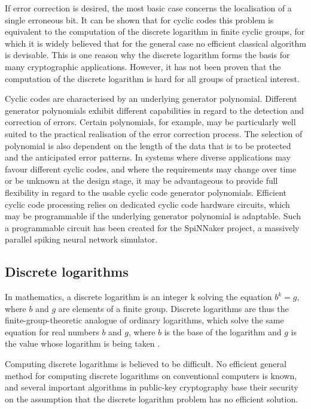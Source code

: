 \documentclass[a4paper, 11pt]{article}
\begin{document}
If error correction is desired, the most basic case concerns the localisation of a single erroneous bit. It can be shown that for cyclic codes this problem is equivalent to the computation of the discrete logarithm in finite cyclic groups, for which it is widely believed that for the general case no efficient classical algorithm is devisable. This is one reason why the discrete logarithm forms the basis for many cryptographic applications. However, it has not been proven that the computation of the discrete logarithm is hard for all groups of practical interest.

Cyclic codes are characterised by an underlying generator polynomial. Different generator polynomials exhibit different capabilities in regard to the detection and correction of errors. Certain polynomials, for example, may be particularly well suited to the practical realisation of the error correction process. The selection of polynomial is also dependent on the length of the data that is to be protected and the anticipated error patterns. In systems where diverse applications may favour different cyclic codes, and where the requirements may change over time or be unknown at the design stage, it may be advantageous to provide full flexibility in regard to the usable cyclic code generator polynomials. Efficient cyclic code processing relies on dedicated cyclic code hardware circuits, which may be programmable if the underlying generator polynomial is adaptable. Such a programmable circuit has been created for the SpiNNaker project, a massively parallel spiking neural network simulator.

\subsection{Discrete logarithms}
In mathematics, a discrete logarithm is an integer k solving the equation $b^k = g$, where $b$ and $g$ are elements of a finite group. Discrete logarithms are thus the finite-group-theoretic analogue of ordinary logarithms, which solve the same equation for real numbers $b$ and $g$, where $b$ is the base of the logarithm and $g$ is the value whose logarithm is being taken \citep{wiki:discretelogs}.

Computing discrete logarithms is believed to be difficult. No efficient general method for computing discrete logarithms on conventional computers is known, and several important algorithms in public-key cryptography base their security on the assumption that the discrete logarithm problem has no efficient solution.
\end{document}
